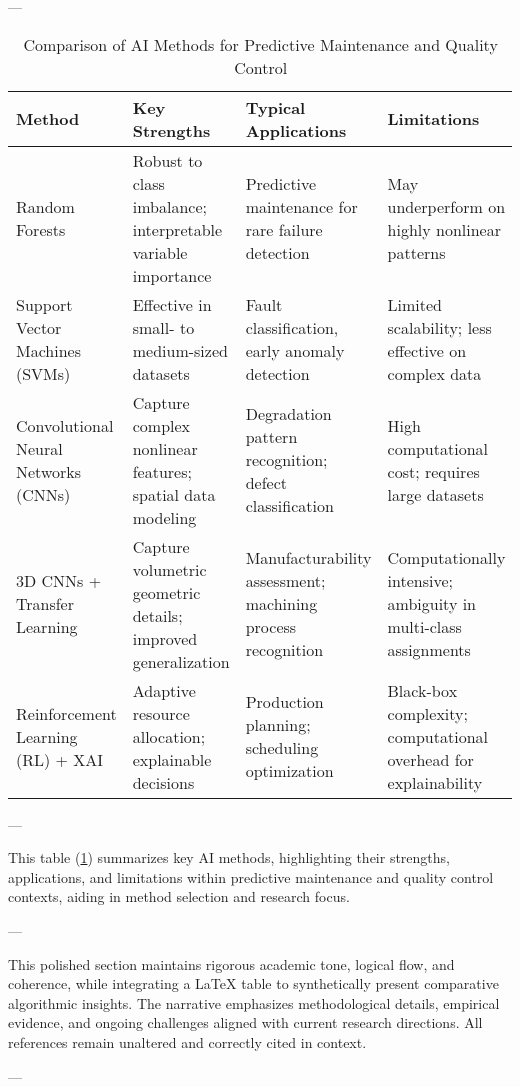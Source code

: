 \documentclass[11pt]{article}
\begin{document}
---

\begin{table}[ht]
\centering
\caption{Comparison of AI Methods for Predictive Maintenance and Quality Control}
\label{tab:method_comparison}
\begin{tabular}{p{3cm} p{5cm} p{4cm} p{3cm}}
\hline
\textbf{Method} & \textbf{Key Strengths} & \textbf{Typical Applications} & \textbf{Limitations} \\
\hline
Random Forests & Robust to class imbalance; interpretable variable importance & Predictive maintenance for rare failure detection & May underperform on highly nonlinear patterns \\
Support Vector Machines (SVMs) & Effective in small- to medium-sized datasets & Fault classification, early anomaly detection & Limited scalability; less effective on complex data \\
Convolutional Neural Networks (CNNs) & Capture complex nonlinear features; spatial data modeling & Degradation pattern recognition; defect classification & High computational cost; requires large datasets \\
3D CNNs + Transfer Learning & Capture volumetric geometric details; improved generalization & Manufacturability assessment; machining process recognition & Computationally intensive; ambiguity in multi-class assignments \\
Reinforcement Learning (RL) + XAI & Adaptive resource allocation; explainable decisions & Production planning; scheduling optimization & Black-box complexity; computational overhead for explainability \\
\hline
\end{tabular}
\end{table}

---

This table (\ref{tab:method_comparison}) summarizes key AI methods, highlighting their strengths, applications, and limitations within predictive maintenance and quality control contexts, aiding in method selection and research focus.

---

This polished section maintains rigorous academic tone, logical flow, and coherence, while integrating a LaTeX table to synthetically present comparative algorithmic insights. The narrative emphasizes methodological details, empirical evidence, and ongoing challenges aligned with current research directions. All references remain unaltered and correctly cited in context.

---
\end{document}
